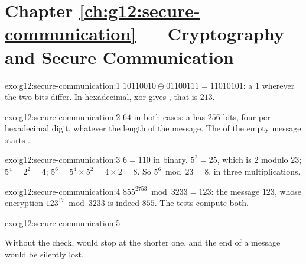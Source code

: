 \section*{Chapter \ref{ch:g12:secure-communication} --- Cryptography and Secure Communication}

\begin{solution}{exo:g12:secure-communication:1}
$10110010 \oplus 01100111 = 11010101$: a $1$ wherever the two bits differ. In hexadecimal,  xor 
gives , that is $213$.
\end{solution}

\begin{solution}{exo:g12:secure-communication:2}
$64$ in both cases: a  has $256$ bits, four per hexadecimal digit, whatever the length of the message. The
 of the empty message starts .
\end{solution}

\begin{solution}{exo:g12:secure-communication:3}
$6 = 110$ in binary. $5^2 = 25$, which is $2$ modulo $23$; $5^4 = 2^2 = 4$; $5^6 = 5^4 \times 5^2 = 4 \times 2 = 8$.
So $5^6 \bmod 23 = 8$, in three multiplications.
\end{solution}

\begin{solution}{exo:g12:secure-communication:4}
$855^{2753} \bmod 3233 = 123$: the message $123$, whose encryption $123^{17} \bmod 3233$ is indeed $855$. The tests
compute both.
\end{solution}

\begin{solution}{exo:g12:secure-communication:5}
\smallskip\noindent\hspace*{2em}

\noindent\hspace*{4em}

\noindent\hspace*{6em}

\noindent\hspace*{4em}

\smallskip\noindent Without the check,  would stop at the shorter one, and the end of a message would be
silently lost.
\end{solution}


